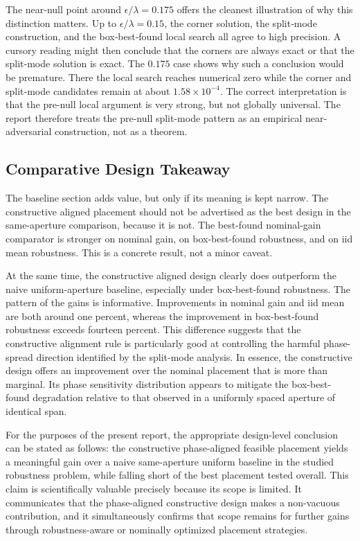 The near‑null point around \(\epsilon/\lambda = 0.175\) offers the cleanest illustration of why this distinction matters. Up to \(\epsilon/\lambda = 0.15\), the corner solution, the split‑mode construction, and the box‑best‑found local search all agree to high precision. A cursory reading might then conclude that the corners are always exact or that the split‑mode solution is exact. The \(0.175\) case shows why such a conclusion would be premature. There the local search reaches numerical zero while the corner and split‑mode candidates remain at about \(1.58 \times 10^{-4}\).
 The correct interpretation is that the pre-null local argument is very strong, but not globally universal. The report therefore treats the pre-null split-mode pattern as an empirical near-adversarial construction, not as a theorem.

\subsection{Comparative Design Takeaway}

The baseline section adds value, but only if its meaning is kept narrow. The constructive aligned placement should not be advertised as the best design in the same-aperture comparison, because it is not. The best-found nominal-gain comparator is stronger on nominal gain, on box-best-found robustness, and on iid mean robustness. This is a concrete result, not a minor caveat.

At the same time, the constructive aligned design clearly does outperform the naive uniform-aperture baseline, especially under box-best-found robustness. The pattern of the gains is informative. Improvements in nominal gain and iid mean are both around one percent, whereas the improvement in box-best-found robustness exceeds fourteen percent. This difference suggests that the constructive alignment rule is particularly good at controlling the harmful phase-spread direction identified by the split-mode analysis. In essence, the constructive design offers an improvement over the nominal placement that is more than marginal. Its phase sensitivity distribution appears to mitigate the box-best-found degradation relative to that observed in a uniformly spaced aperture of identical span.

For the purposes of the present report, the appropriate design-level conclusion can be stated as follows: the constructive phase-aligned feasible placement yields a meaningful gain over a naive same-aperture uniform baseline in the studied robustness problem, while falling short of the best placement tested overall. This claim is scientifically valuable precisely because its scope is limited. It communicates that the phase-aligned constructive design makes a non-vacuous contribution, and it simultaneously confirms that scope remains for further gains through robustness-aware or nominally optimized placement strategies.

